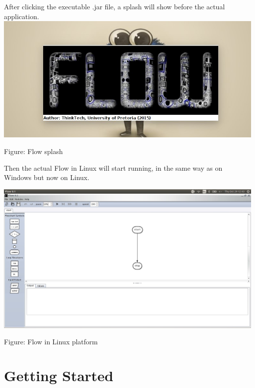 \documentclass[11pt,a4paper,titlepage]{article}
\begin{document}
		After clicking the executable .jar file, a splash will show before the actual application. \newline \newline
		\includegraphics[width=14cm]{images/splash.jpg}		
		\begin{center}
			Figure: Flow splash \newline
		\end{center}
		
		Then the actual Flow in Linux will start running, in the same way as on Windows but now on Linux.\newline
		
		\includegraphics[width=14cm]{images/linuxFlow.jpg}		
		\begin{center}
			Figure: Flow in Linux platform \newline
		\end{center}
		

\section{Getting Started}
	
	
\end{document}
